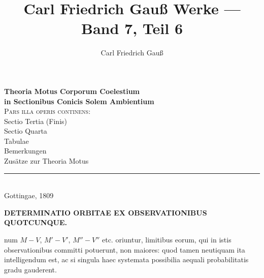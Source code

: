 \documentclass[11pt,a4paper]{article}
\title{Carl Friedrich Gauß Werke --- Band 7, Teil 6}
\author{Carl Friedrich Gauß}
\date{}
\begin{document}
\maketitle
\thispagestyle{empty}

\vspace{1cm}

\begin{center}
\Large\textbf{\foreignlanguage{latin}{Theoria Motus Corporum Coelestium}}\\[0.5em]
\large\textbf{\foreignlanguage{latin}{in Sectionibus Conicis Solem Ambientium}}\\[1em]
\normalsize
\textsc{Pars illa operis continens:}\\[0.3em]
\foreignlanguage{latin}{Sectio Tertia (Finis)}\\[0.3em]
\foreignlanguage{latin}{Sectio Quarta}\\[0.3em]
\foreignlanguage{latin}{Tabulae}\\[0.3em]
\foreignlanguage{ngerman}{Bemerkungen}\\[0.3em]
\foreignlanguage{ngerman}{Zusätze zur Theoria Motus}\\[1em]
\rule{0.6\textwidth}{0.4pt}\\[0.5em]
\small Gottingae, 1809
\end{center}

\vfill

\newpage
\setcounter{page}{251}


\begin{center}
\large\textbf{\foreignlanguage{latin}{DETERMINATIO ORBITAE EX OBSERVATIONIBUS QUOTCUNQUE.}}
\end{center}

\vspace{0.5em}

num $M-V$, $M'-V'$, $M''-V''$ etc.
oriuntur, limitibus eorum, qui in istis observationibus committi potuerunt, non maiores: quod tamen neutiquam ita intelligendum est, ac si singula haec systemata possibilia aequali probabilitatis gradu gauderent.
\end{document}
